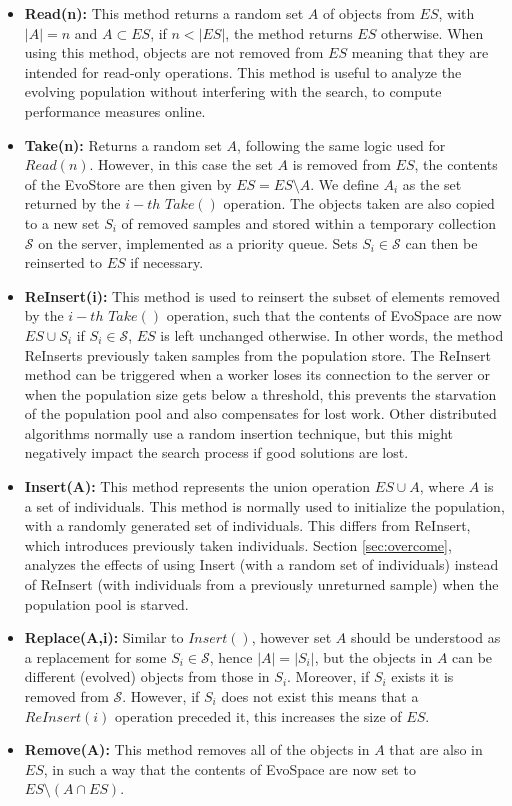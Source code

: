 \begin{itemize}
 \item \textbf{Read(n):} This method returns a random set $A$ of objects from $ES$, with $|A|=n$ and $A\subset ES$, if $n< |ES|$, the method returns $ES$ otherwise. When using this method, objects are not removed from $ES$ meaning that they are intended for read-only operations.
This method is useful to analyze the evolving population without interfering with the search, to compute performance measures online.

\item \textbf{Take(n):} Returns a random set $A$, following the same logic used for $Read(n)$. However, in this case the set $A$ is removed from $ES$, the contents of the EvoStore are then given by $ES = ES \setminus A$.
We define  $A_i$ as the set returned by the $i-th$ $Take()$ operation.
The objects taken are also copied to a new set $S_i$ of removed samples and stored
within a temporary collection $\mathcal{S}$ on the server, implemented as a priority queue. Sets $S_i \in \mathcal{S}$ can then be reinserted to $ES$ if necessary.  
 
 \item \textbf{ReInsert(i):} This method is used to reinsert the subset of elements removed by the $i-th$ $Take()$ operation,
  such that the contents of EvoSpace are now $ES \cup S_i$ if $S_i \in \mathcal{S}$, $ES$ is left unchanged otherwise.
  In other words, the method ReInserts previously taken samples from the population store.
  The ReInsert method can be triggered when a worker loses its connection to the server or when the population size gets below a threshold, this prevents the starvation
  of the population pool and also compensates for lost work. Other distributed algorithms normally use a random insertion technique, but this might negatively impact the search process if good solutions are lost.
      
 \item \textbf{Insert(A):} This method represents the union operation $ES \cup A$, where $A$ is a set of individuals.
 This method is normally used to initialize the population, with a randomly generated set of individuals.
 This differs from ReInsert, which introduces previously taken individuals.
 Section \ref{sec:overcome}, analyzes the effects of using Insert (with a random set of individuals) instead of ReInsert (with individuals from a previously
 unreturned sample) when the population pool is starved.

 \item \textbf{Replace(A,i):} Similar to $Insert()$, however set $A$ should be understood as a replacement for
  some $S_i \in \mathcal{S}$, hence $|A| = |S_i|$, but the objects in $A$ can be different (evolved) objects from those in $S_i$.
  Moreover, if $S_i$ exists it is removed from $\mathcal{S}$.
  However, if $S_i$ does not exist this means that a $ReInsert(i)$ operation preceded it, this increases the size of $ES$.

 \item \textbf{Remove(A):} This method removes all of the objects in $A$ that are also in $ES$, in such a way that
  the contents of EvoSpace are now set to $ES \setminus (A\cap ES)$.
\end{itemize}
